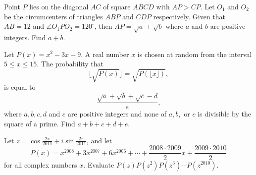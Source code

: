%	








\begin{question}[name={2011 AIME II, \href{https://artofproblemsolving.com/community/c4p2224408}{Problem 13}}]
	Point $P$ lies on the diagonal $AC$ of square $ABCD$ with $AP>CP$. Let $O_1$ and $O_2$ be the circumcenters of triangles $ABP$ and $CDP$ respectively. Given that $AB=12$ and $\angle O_1 P O_2 = 120^\circ$, then $AP=\sqrt{a}+\sqrt{b}$ where $a$ and $b$ are positive integers. Find $a+b$.
\end{question}


%	













\begin{question}[name={2011 AIME II, \href{https://artofproblemsolving.com/community/c4p2224410}{Problem 15}}]
	Let $P(x)=x^2-3x-9$. A real number $x$ is chosen at random from the interval $5\leq x \leq 15$. The probability that $$\lfloor \sqrt{P(x)} \rfloor = \sqrt{P(\lfloor x \rfloor )},$$ is equal to $$\dfrac{\sqrt{a}+\sqrt{b}+\sqrt{c}-d}{e},$$ where $a,b,c,d$ and $e$ are positive integers and none of $a,b,$ or $c$ is divisible by the square of a prime. Find $a+b+c+d+e$.
\end{question}


%	







\begin{question}[name={2011 HMMT, Algebra, \href{https://artofproblemsolving.com/community/c129h520361p2930895}{Problem 8}}]
	Let $z = \cos \frac{2\pi}{2011} + i\sin \frac{2\pi}{2011}$, and let\[ P(x) = x^{2008} + 3x^{2007} + 6x^{2006} + \cdots + \frac{2008 \cdot 2009}{2} x + \frac{2009 \cdot 2010}{2} \]for all complex numbers $x$. Evaluate $P(z)P(z^2)P(z^3) \cdots P(z^{2010})$.
\end{question}


